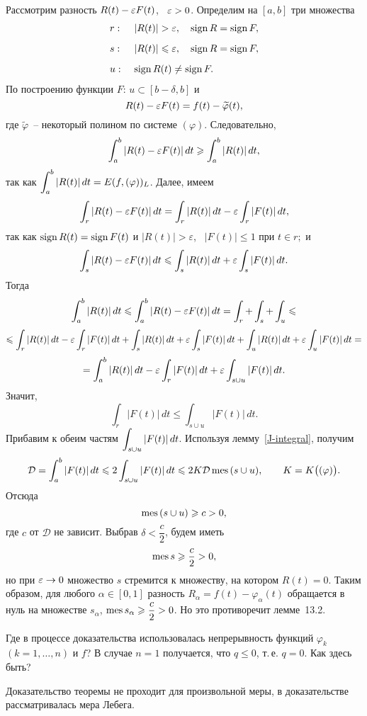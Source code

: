 Рассмотрим разность $R(t)-\varepsilon F(t)$,~ $\varepsilon>0$. Определим на $[a,b]$ три множества
$$
\begin{array}{ll}
r:\ & |R(t)|> \eps,\quad \sign R=\sign F,\\[2ex]
s:\ & |R(t)|\le \eps,\quad \sign R=\sign F,\\[2ex]
u:\ & \sign R(t)\ne \sign F.
\end{array}
$$
По построению функции $F$: $u\subset [b-\delta,b]$ и
$$
R(t)-\varepsilon F(t)=f(t)-\widetilde\varphi(t),
$$
где $\widetilde\varphi$~-- некоторый полином по системе $(\varphi)$. Следовательно,
$$ \int_a^b |R(t)-\varepsilon F(t)|\, dt\geqslant \int_a^b |R(t)|\,dt, $$
так как $\displaystyle\int_a^b |R(t)|\,dt=E(f,(\varphi))_L$. Далее,
имеем
$$
\int_r |R(t)-\varepsilon F(t)|\, dt=\int_r |R(t)|\, dt-\varepsilon \int_r |F(t)|\,dt,
$$
так как ${\rm sign \, } R(t)={\rm sign \, } F(t)$ и $|R(t)|> \varepsilon$,~ $|F(t)|\le 1$ при $t\in r;$
и
$$
\int_s |R(t)-\varepsilon F(t)|\, dt\leqslant \int_s |R(t)|\, dt+\varepsilon \int_s |F(t)|\, dt.
$$
Тогда
$$
\int_a^b |R(t)|\, dt\leqslant\int_a^b |R(t)-\varepsilon F(t)|\, dt= \int_r+\int_s+\int_u\leqslant
$$
$$
\leqslant \int_r |R(t)|\, dt-\varepsilon\int_r|F(t)|\, dt+\int_s|R(t)|\,
dt+ \varepsilon \int_s |F(t)|\, dt+\int_u |R(t)|\, dt+\varepsilon \int_u |F(t)|\, dt=
$$
$$
 =\int_a^b |R(t)|\, dt-\varepsilon\int_r |F(t)|\, dt+\varepsilon \int_{s\cup u}
|F(t)|\, dt.
$$
Значит,
$$
\int_r |F(t)|\, dt \le \int_{s\cup u} |F(t)|\,dt.
$$
Прибавим к обеим частям $\displaystyle\int_{s\cup u} |F(t)|\,dt$. Используя
лемму~\ref{J-integral}, получим
$$
\mathcal D = \int_a^b |F(t)|\,dt\leqslant 2 \int_{s\cup u} |F(t)|\,dt\leqslant 2K\mathcal D\,
{\rm mes \, }(s\cup u),\qquad K=K\big((\varphi)\big).
$$
Отсюда
$$ {\rm mes \, }(s\cup u)\geqslant c>0, $$
где $c$ от $\mathcal D$ не зависит. Выбрав $\delta<\dfrac{c}{2}$, будем иметь
$$ {\rm mes \, } s\geqslant \frac{c}{2}>0, $$
но при $\varepsilon\to 0$ множество $s$ стремится к множеству, на котором $R(t)=0$.
Таким образом, для любого $\alpha\in [0,1]$ разность
$R_{\alpha}=f(t)-\varphi_{\alpha}(t)$ обращается в нуль на множестве
$s_{\alpha}$, ${\rm mes \, } s_{\alpha}\geqslant \dfrac{c}{2}>0$.
Но это противоречит лемме~13.2.


\begin{ex}
Где в процессе доказательства использовалась непрерывность функций
$\varphi_k$~ $(k=1,\ldots,n)$ и $f$? В случае $n=1$ получается, что
$q\le 0$, т.\,е. $q=0$. Как здесь быть?
\end{ex}

\begin{Remark}
Доказательство теоремы не проходит для произвольной меры, в доказательстве
рассматривалась мера Лебега.
\end{Remark}
